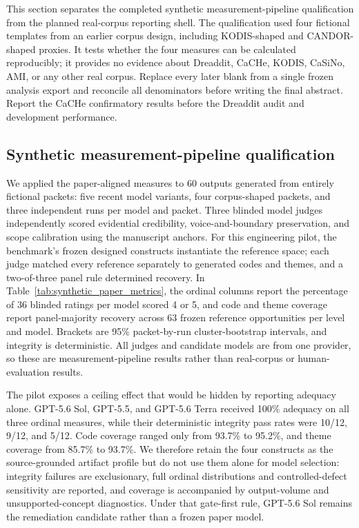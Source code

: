 This section separates the completed synthetic measurement-pipeline
qualification from the planned real-corpus reporting shell. The
qualification used four fictional templates from an earlier corpus design,
including KODIS-shaped and CANDOR-shaped proxies. It tests whether the four
measures can be calculated reproducibly; it provides no evidence about
Dreaddit, CaCHe, KODIS, CaSiNo, AMI, or any other real corpus. Replace every later
blank from a single frozen analysis export and reconcile all denominators
before writing the final abstract. Report the CaCHe confirmatory results before
the Dreaddit audit and development performance.

\subsection{Synthetic measurement-pipeline qualification}

We applied the paper-aligned measures to 60 outputs generated from entirely fictional packets: five recent model variants, four corpus-shaped packets, and three independent runs per model and packet. Three blinded model judges independently scored evidential credibility, voice-and-boundary preservation, and scope calibration using the manuscript anchors. For this engineering pilot, the benchmark's frozen designed constructs instantiate the reference space; each judge matched every reference separately to generated codes and themes, and a two-of-three panel rule determined recovery. In Table~\ref{tab:synthetic_paper_metrics}, the ordinal columns report the percentage of 36 blinded ratings per model scored 4 or 5, and code and theme coverage report panel-majority recovery across 63 frozen reference opportunities per level and model. Brackets are 95\% packet-by-run cluster-bootstrap intervals, and integrity is deterministic. All judges and candidate models are from one provider, so these are measurement-pipeline results rather than real-corpus or human-evaluation results.

The pilot exposes a ceiling effect that would be hidden by reporting adequacy alone. GPT-5.6 Sol, GPT-5.5, and GPT-5.6 Terra received 100\% adequacy on all three ordinal measures, while their deterministic integrity pass rates were 10/12, 9/12, and 5/12. Code coverage ranged only from 93.7\% to 95.2\%, and theme coverage from 85.7\% to 93.7\%. We therefore retain the four constructs as the source-grounded artifact profile but do not use them alone for model selection: integrity failures are exclusionary, full ordinal distributions and controlled-defect sensitivity are reported, and coverage is accompanied by output-volume and unsupported-concept diagnostics. Under that gate-first rule, GPT-5.6 Sol remains the remediation candidate rather than a frozen paper model.


